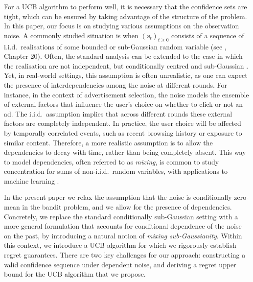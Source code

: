For a UCB algorithm to perform well, it is necessary that the confidence sets are tight, which can be ensured by taking 
advantage of the structure of the problem. In this paper, our focus is on studying various assumptions on the 
observation noise. A commonly studied situation is when $(\ee_t)_{t\geq 0}$ consists of a sequence of 
i.i.d.~realisations of some bounded or sub-Gaussian random variable (see \citealp{lattimore2020bandit}, Chapter 20). 
Often, the standard analysis can be extended to the case in which the realisation are not independent, but conditionally 
centred and sub-Gaussian \citep{abbasi2011improved}. Yet, in real-world settings, this assumption is often unrealistic, 
as one can expect the presence of interdependencies among the noise at different rounds. For instance, in the context of 
advertisement selection, the noise models the ensemble of external factors that influence the user's choice on whether 
to click or not an ad. The i.i.d.~assumption implies that across different rounds these external factors are completely 
independent. In practice, the user choice will be affected by temporally correlated events, such as recent browsing 
history or exposure to similar content. Therefore, a more realistic assumption is to allow the dependencies to decay 
with time, rather than being completely absent. This way to model dependencies, often referred to as \emph{mixing}, is common to study concentration for sums of non-i.i.d.~random variables, with applications to machine learning \citep{bradley2005basic, mohri2008rademacher,abeles2024generalization}.

In the present paper we relax the assumption that the noise is conditionally zero-mean in the bandit problem, and we allow for the presence of dependencies. Concretely, we replace  the standard 
conditionally sub-Gaussian setting with a more general formulation that accounts for conditional 
dependence of the noise on the past, by introducing a natural notion of \emph{mixing sub-Gaussianity}. Within this 
context, we introduce a UCB algorithm for which we rigorously establish regret guarantees. There are two key challenges 
for our approach: constructing a valid confidence sequence under dependent noise, and deriving a regret upper bound for 
the UCB algorithm that we propose. 

